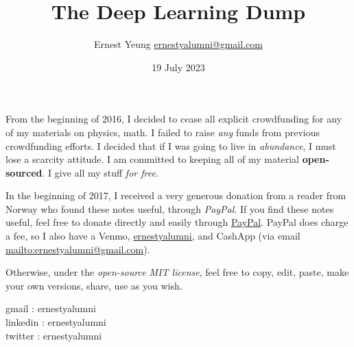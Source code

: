 \documentclass[10pt]{amsart}
\title{The Deep Learning Dump}
\author{Ernest Yeung \href{mailto:ernestyalumni@gmail.com}{ernestyalumni@gmail.com}}
\date{19 July 2023}
\begin{document}
	
	
\maketitle
	
From the beginning of 2016, I decided to cease all explicit crowdfunding for any of my materials on physics, math.  I failed to raise \emph{any} funds from previous crowdfunding efforts.  I decided that if I was going to live in \emph{abundance}, I must lose a scarcity attitude.  I am committed to keeping all of my material \textbf{open-sourced}.  I give all my stuff \emph{for free}.   
	
In the beginning of 2017, I received a very generous donation from a reader from Norway who found these notes useful, through \emph{PayPal}.  If you find these notes useful, feel free to donate directly and easily through \href{https://www.paypal.com/cgi-bin/webscr?cmd=_donations&business=ernestsaveschristmas%2bpaypal%40gmail%2ecom&lc=US&item_name=ernestyalumni&currency_code=USD&bn=PP%2dDonationsBF%3abtn_donateCC_LG%2egif%3aNonHosted}{PayPal}. PayPal does charge a fee, so I also have a Venmo, \href{https://account.venmo.com/u/ernestyalumni}{ernestyalumni}, and CashApp (via email \url{mailto:ernestyalumni@gmail.com}).

Otherwise, under the \emph{open-source MIT license}, feel free to copy, edit, paste, make your own versions, share, use as you wish.    

\noindent gmail        : ernestyalumni \\
linkedin     : ernestyalumni \\
twitter      : ernestyalumni \\
\end{document}
